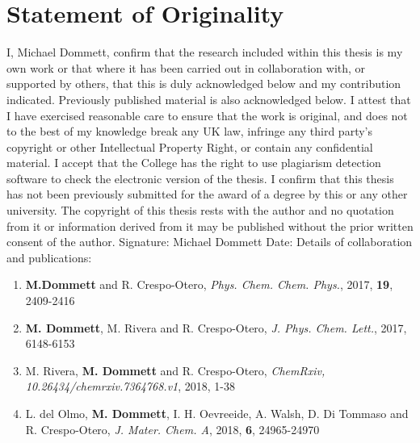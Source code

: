 \chapter*{Statement of Originality}
I, Michael Dommett, confirm that the research included within this thesis is my own work or that where it has been carried out in collaboration with, or supported by others, that this is duly acknowledged below and my contribution indicated. Previously published material is also acknowledged below.
I attest that I have exercised reasonable care to ensure that the work is original, and does not to the best of my knowledge break any UK law, infringe any third party's copyright or other Intellectual Property Right, or contain any confidential material.
I accept that the College has the right to use plagiarism detection software to check the electronic version of the thesis.
I confirm that this thesis has not been previously submitted for the award of a degree by this or any other university.
The copyright of this thesis rests with the author and no quotation from it or information derived from it may be published without the prior written consent of the author.
\newline
\newline
Signature: Michael Dommett 
Date:
\newline
\newline
Details of collaboration and publications:
\begin{enumerate}
    \item \textbf{M.Dommett} and R. Crespo-Otero, \textit{Phys. Chem. Chem. Phys.}, 2017, \textbf{19}, 2409-2416
    \item \textbf{M. Dommett}, M. Rivera and R. Crespo-Otero, \textit{J. Phys. Chem. Lett.}, 2017, 6148-6153
    \item M. Rivera, \textbf{M. Dommett}  and R. Crespo-Otero, \textit{ChemRxiv, 10.26434/chemrxiv.7364768.v1}, 2018, 1-38
    \item L. del Olmo, \textbf{M. Dommett}, I. H. Oevreeide, A. Walsh, D. Di Tommaso and R. Crespo-Otero, \textit{J. Mater. Chem. A}, 2018, \textbf{6}, 24965-24970
\end{enumerate}